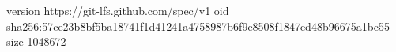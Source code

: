 version https://git-lfs.github.com/spec/v1
oid sha256:57ce23b8bf5ba18741f1d41241a4758987b6f9e8508f1847ed48b96675a1bc55
size 1048672
